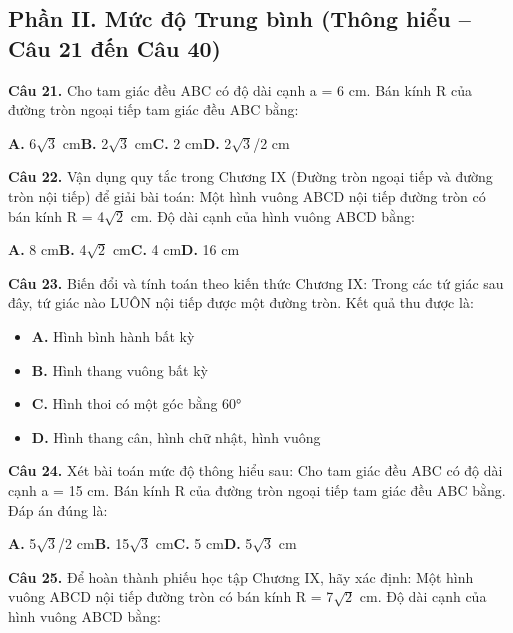 \documentclass[11pt,a4paper]{article}
\begin{document}
\subsection*{\color{accent} Phần II. Mức độ Trung bình (Thông hiểu -- Câu 21 đến Câu 40)}
\textbf{\color{primary} Câu 21.} Cho tam giác đều ABC có độ dài cạnh a = 6 cm. Bán kính R của đường tròn ngoại tiếp tam giác đều ABC bằng:\par
\hspace*{1.5em}\textbf{A.} 6$\sqrt{3}$ cm\quad\quad \textbf{B.} 2$\sqrt{3}$ cm\quad\quad \textbf{C.} 2 cm\quad\quad \textbf{D.} 2$\sqrt{3}$/2 cm\par\vspace{2pt}
\textbf{\color{primary} Câu 22.} Vận dụng quy tắc trong Chương IX (Đường tròn ngoại tiếp và đường tròn nội tiếp) để giải bài toán: Một hình vuông ABCD nội tiếp đường tròn có bán kính R = 4$\sqrt{2}$ cm. Độ dài cạnh của hình vuông ABCD bằng:\par
\hspace*{1.5em}\textbf{A.} 8 cm\quad\quad \textbf{B.} 4$\sqrt{2}$ cm\quad\quad \textbf{C.} 4 cm\quad\quad \textbf{D.} 16 cm\par\vspace{2pt}
\textbf{\color{primary} Câu 23.} Biến đổi và tính toán theo kiến thức Chương IX: Trong các tứ giác sau đây, tứ giác nào LUÔN nội tiếp được một đường tròn. Kết quả thu được là:\par
\begin{itemize}\setlength{\itemsep}{1pt}\setlength{\parskip}{0pt}
  \item[] \textbf{A.} Hình bình hành bất kỳ
  \item[] \textbf{B.} Hình thang vuông bất kỳ
  \item[] \textbf{C.} Hình thoi có một góc bằng 60°
  \item[] \textbf{D.} Hình thang cân, hình chữ nhật, hình vuông
\end{itemize}\vspace{2pt}
\textbf{\color{primary} Câu 24.} Xét bài toán mức độ thông hiểu sau: Cho tam giác đều ABC có độ dài cạnh a = 15 cm. Bán kính R của đường tròn ngoại tiếp tam giác đều ABC bằng. Đáp án đúng là:\par
\hspace*{1.5em}\textbf{A.} 5$\sqrt{3}$/2 cm\quad\quad \textbf{B.} 15$\sqrt{3}$ cm\quad\quad \textbf{C.} 5 cm\quad\quad \textbf{D.} 5$\sqrt{3}$ cm\par\vspace{2pt}
\textbf{\color{primary} Câu 25.} Để hoàn thành phiếu học tập Chương IX, hãy xác định: Một hình vuông ABCD nội tiếp đường tròn có bán kính R = 7$\sqrt{2}$ cm. Độ dài cạnh của hình vuông ABCD bằng:\par
\end{document}
